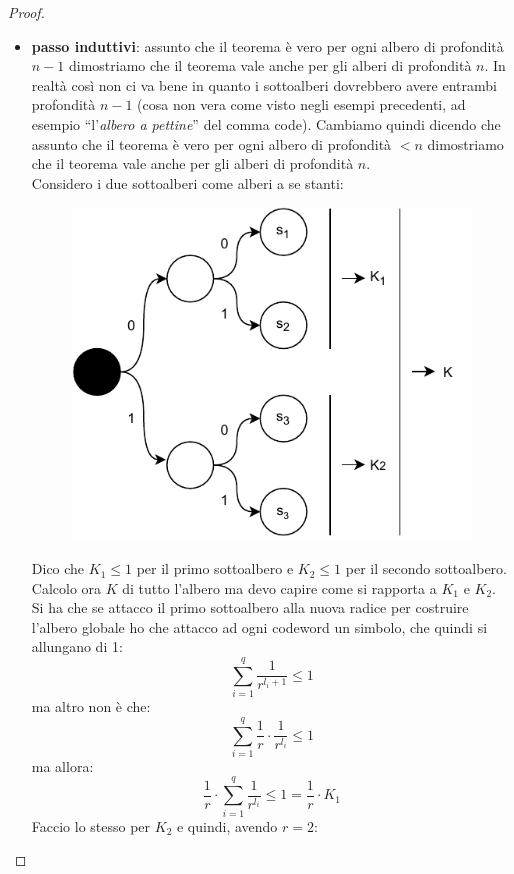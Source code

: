 \documentclass[a4paper,12pt, oneside]{book}
\begin{document}
\begin{proof}
\begin{itemize}
    \item \textbf{passo induttivi}: assunto che il teorema è vero per ogni
    albero di profondità $n-1$ dimostriamo che il teorema vale anche per gli
    alberi di profondità $n$. In realtà così non ci va bene in quanto i
    sottoalberi dovrebbero avere entrambi profondità $n-1$ (cosa non vera come
    visto negli esempi precedenti, ad esempio ``l'\textit{albero a pettine}''
    del comma code). Cambiamo quindi dicendo che  assunto che il teorema è vero
    per ogni albero di profondità $<n$ dimostriamo che il teorema vale anche per
    gli alberi di profondità $n$.\\
    Considero i due sottoalberi come alberi a se stanti:
    \begin{figure}[H]
      \centering
      \includegraphics[scale = 0.7]{img/ct7.pdf}
    \end{figure}
    Dico che $K_1\leq 1$ per il primo sottoalbero e $K_2\leq 1$ per il secondo
    sottoalbero. \\
    Calcolo ora $K$ di tutto l'albero ma devo capire come si rapporta a $K_1$ e
    $K_2$. Si ha che se attacco il primo sottoalbero alla nuova radice per
    costruire l'albero globale ho che attacco ad ogni codeword un simbolo, che
    quindi si allungano di 1:
    \[\sum_{i=1}^q\frac{1}{r^{l_i+1}}\leq 1\]
    ma altro non è che:
    \[\sum_{i=1}^q\frac{1}{r}\cdot\frac{1}{r^{l_i}}\leq 1\]
    ma allora:
    \[\frac{1}{r}\cdot\sum_{i=1}^q\frac{1}{r^{l_i}}\leq 1=\frac{1}{r}\cdot K_1\]
    Faccio lo stesso per $K_2$ e quindi, avendo $r=2$:

\end{itemize}
\end{proof}
\end{document}
